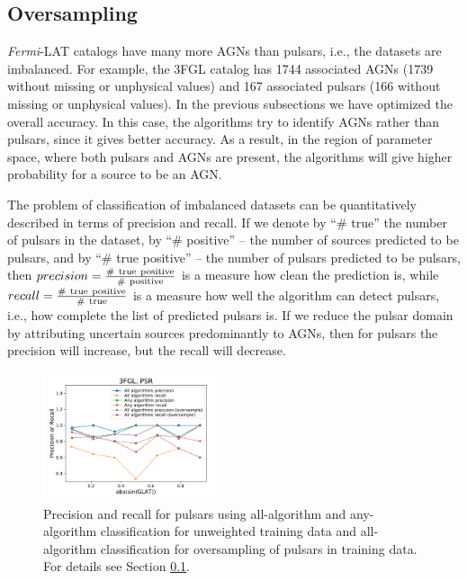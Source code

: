 \documentclass{aa}
\newcommand{\lb}{\label}
\newcommand{\Fermi}{\textit{Fermi}\xspace}
\newcommand{\twopicsp}{0.45}
\begin{document}
\subsection{Oversampling}
\lb{sec:oversampling}

\Fermi-LAT catalogs have many more AGNs than pulsars, i.e., the datasets are imbalanced.
For example, the 3FGL catalog has 1744 associated AGNs (1739 without missing or unphysical values)
and 167 associated pulsars (166 without missing or unphysical values).
In the previous subsections we have optimized the overall accuracy. In this case, the algorithms try to identify AGNs rather than pulsars,
since it gives better accuracy. As a result, in the region of parameter space, where both pulsars and AGNs are present, the algorithms
will give higher probability for a source to be an AGN.


The problem of classification of imbalanced datasets can be quantitatively described in terms of precision and recall.
If we denote by ``\# true'' the number of pulsars in the dataset, by ``\# positive'' -- the number of sources predicted to be pulsars, and by 
``\# true positive'' -- the number of pulsars predicted to be pulsars, then  $precision \rm = \frac{\#\ true\ positive}{\#\ positive}$ is a measure how clean the prediction is, while $recall \rm = \frac{\#\ true\ positive}{\#\ true}$ is a measure how well the algorithm can detect pulsars, i.e., how complete the list of predicted pulsars is.
If we reduce the pulsar domain by attributing uncertain sources predominantly to AGNs, then for pulsars the precision will increase, but the recall will decrease.



\begin{figure}[h]
\centering
\includegraphics[width=\twopicsp\textwidth]{plots/all_algs_3FGL_precision_recall_oversample_PSR.pdf}
\caption{Precision and recall for pulsars using all-algorithm and any-algorithm classification for unweighted training data and
all-algorithm classification for oversampling of pulsars in training data. For details see Section \ref{sec:oversampling}.}
\label{fig:prec_recall}
\end{figure}
\end{document}

